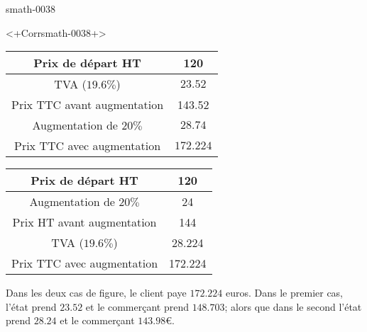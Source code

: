 
\begin{corrige}{smath-0038}

<+Corrsmath-0038+>

    \begin{multicols}{2}
        \begin{tabular}[]{|c||c|}
            \hline
            Prix de départ HT&120\\
            \hline\hline
            TVA (\( 19.6\%\))&\( 23.52\)\\
            \hline
            Prix TTC avant augmentation&143.52\\
            \hline
            Augmentation de \( 20\%\)&\( 28.74\)\\
            \hline
            Prix TTC avec augmentation&\( 172.224\)\\
            \hline
        \end{tabular}

    \columnbreak

        \begin{tabular}[]{|c||c|}
            \hline
            Prix de départ HT&120\\
            \hline\hline
            Augmentation de \( 20\%\)&24\\
            \hline
            Prix HT avant augmentation&144\\
            \hline
            TVA (\( 19.6\%\))&28.224\\
            \hline
            Prix TTC avec augmentation&172.224\\
            \hline
        \end{tabular}
    \end{multicols}

    Dans les deux cas de figure, le client paye \( 172.224\) euros. Dans le premier cas, l'état prend \( 23.52\) et le commerçant prend \( 148.703\); alors que dans le second l'état prend $28.24$ et le commerçant \( 143.98\)€.

\end{corrige}
